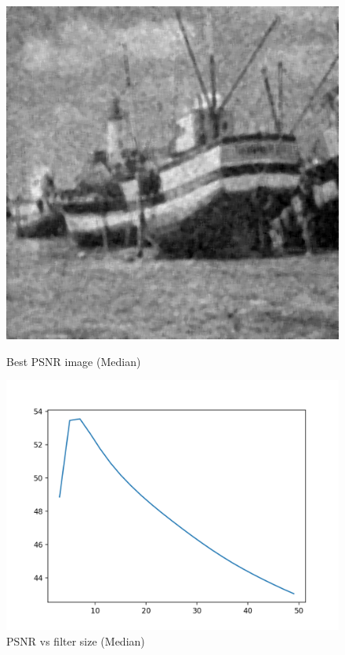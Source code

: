 \documentclass{article}
\begin{document}
    \begin{figure}[!htb]
      \includegraphics[scale=0.3]{./basic_denoising/boat/median_best_gaussian.png}
      \caption{Best PSNR image (Median)}
    \endminipage \hfill
      \includegraphics[scale=.45]{./basic_denoising/boat/median_psnr_gaussian.png}
      \caption{PSNR vs filter size (Median)}
    \endminipage
    \end{figure}
    \pagebreak
\end{document}
